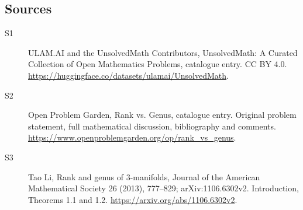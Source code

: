 \documentclass[11pt]{article}
\begin{document}
\subsection{Sources}
\begin{description}
\item[\hypertarget{source:statement:1}{S1}] ULAM.AI and the UnsolvedMath Contributors, UnsolvedMath: A Curated Collection of Open Mathematics Problems, catalogue entry. CC BY 4.0. \url{https://huggingface.co/datasets/ulamai/UnsolvedMath}.
\item[\hypertarget{source:statement:2}{S2}] Open Problem Garden, Rank vs. Genus, catalogue entry. Original problem statement, full mathematical discussion, bibliography and comments. \url{https://www.openproblemgarden.org/op/rank_vs_genus}.
\item[\hypertarget{source:statement:3}{S3}] Tao Li, Rank and genus of 3-manifolds, Journal of the American Mathematical Society 26 (2013), 777--829; arXiv:1106.6302v2. Introduction, Theorems 1.1 and 1.2. \url{https://arxiv.org/abs/1106.6302v2}.
\end{description}
\label{end:statement}
\end{document}
